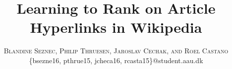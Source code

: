 \documentclass[twoside]{article}
\title{\vspace{-15mm}\fontsize{20pt}{10pt}\selectfont\textbf{Learning to Rank on Article Hyperlinks in Wikipedia}} %
\author{
\large
\textsc{Blandine Seznec, Philip Thruesen, Jaroslav Cechak, and Roel Castano}\\[2mm] %
\normalsize {\{bsezne16, pthrue15, jcheca16, rcasta15\}@student.aau.dk} %
}
\begin{document}



\thispagestyle{fancy} %

\begin{multicols}{2} %




























%
\printbibliography

\end{multicols}
%
\end{document}
